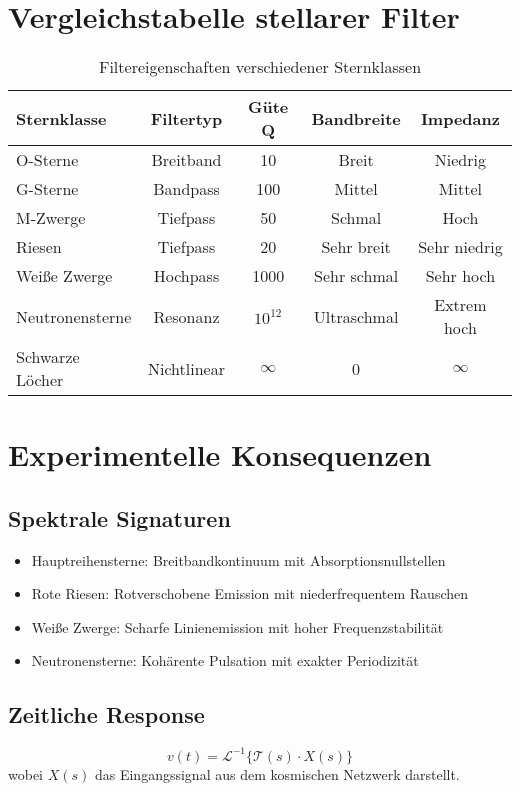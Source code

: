 \section{Vergleichstabelle stellarer Filter}

\begin{table}[ht]
\centering
\begin{tabular}{lcccc}
\hline
Sternklasse & Filtertyp & Güte Q & Bandbreite & Impedanz \\
\hline
O-Sterne & Breitband & 10 & Breit & Niedrig \\
G-Sterne & Bandpass & 100 & Mittel & Mittel \\
M-Zwerge & Tiefpass & 50 & Schmal & Hoch \\
Riesen & Tiefpass & 20 & Sehr breit & Sehr niedrig \\
Weiße Zwerge & Hochpass & 1000 & Sehr schmal & Sehr hoch \\
Neutronensterne & Resonanz & $10^{12}$ & Ultraschmal & Extrem hoch \\
Schwarze Löcher & Nichtlinear & $\infty$ & 0 & $\infty$ \\
\hline
\end{tabular}
\caption{Filtereigenschaften verschiedener Sternklassen}
\end{table}

\section{Experimentelle Konsequenzen}

\subsection{Spektrale Signaturen}
\begin{itemize}
\item Hauptreihensterne: Breitbandkontinuum mit Absorptionsnullstellen
\item Rote Riesen: Rotverschobene Emission mit niederfrequentem Rauschen
\item Weiße Zwerge: Scharfe Linienemission mit hoher Frequenzstabilität
\item Neutronensterne: Kohärente Pulsation mit exakter Periodizität
\end{itemize}

\subsection{Zeitliche Response}
\[
v(t) = \mathcal{L}^{-1}\{\mathcal{T}(s)\cdot X(s)\}
\]
wobei $X(s)$ das Eingangssignal aus dem kosmischen Netzwerk darstellt.

